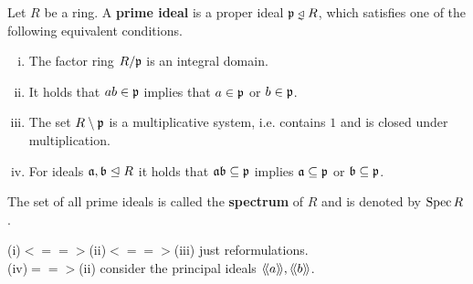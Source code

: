 	\begin{definition}
		Let $R$ be a ring. A \textbf{prime ideal} is a proper ideal $\ideal{p} \divneq R$, which satisfies one of the following equivalent conditions.
		\begin{enumerate}[(i)]
			\item{
				The factor ring $R/\mathfrak{p}$ is an integral domain.
			}
			\item{
				It holds that $ab \in \mathfrak{p}$ implies that $a \in \mathfrak{p}$ or $b \in \mathfrak{p}$.
			}
			\item{
				The set $R \setminus \mathfrak{p}$ is a multiplicative system, i.e. contains $1$ and is closed under multiplication.
			}
			\item{
				For ideals $\mathfrak{a},\mathfrak{b} \trianglelefteq R$ it holds that $\mathfrak{a}\mathfrak{b} \subseteq \mathfrak{p}$ implies $\mathfrak{a} \subseteq \mathfrak{p}$ or $\mathfrak{b} \subseteq \mathfrak{p}$.
			}
		\end{enumerate}
		The set of all prime ideals is called the \textbf{spectrum} of $R$ and is denoted by $\operatorname{Spec} R$.
	\end{definition}
	\begin{sketch}
		(i)$<==>$(ii)$<==>$(iii) just reformulations.\\
		(iv)$==>$(ii) consider the principal ideals $\langle\!\langle a \rangle\!\rangle,\langle\!\langle b \rangle\!\rangle$.\\
	\end{sketch}

